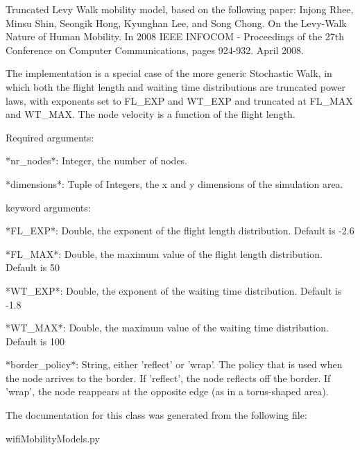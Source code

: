 \begin{DoxyVerb}Truncated Levy Walk mobility model, based on the following paper:
Injong Rhee, Minsu Shin, Seongik Hong, Kyunghan Lee, and Song Chong. On the Levy-Walk Nature of Human Mobility. 
    In 2008 IEEE INFOCOM - Proceedings of the 27th Conference on Computer Communications, pages 924-932. April 2008.

The implementation is a special case of the more generic Stochastic Walk, 
in which both the flight length and waiting time distributions are truncated power laws,
with exponents set to FL_EXP and WT_EXP and truncated at FL_MAX and WT_MAX.
The node velocity is a function of the flight length.

Required arguments:

  *nr_nodes*:
    Integer, the number of nodes.
  
  *dimensions*:
    Tuple of Integers, the x and y dimensions of the simulation area.
  
keyword arguments:

  *FL_EXP*:
    Double, the exponent of the flight length distribution. Default is -2.6
    
  *FL_MAX*:
    Double, the maximum value of the flight length distribution. Default is 50
  
  *WT_EXP*:
    Double, the exponent of the waiting time distribution. Default is -1.8
    
  *WT_MAX*:
    Double, the maximum value of the waiting time distribution. Default is 100
    
  *border_policy*:
    String, either 'reflect' or 'wrap'. The policy that is used when the node arrives to the border.
    If 'reflect', the node reflects off the border.
    If 'wrap', the node reappears at the opposite edge (as in a torus-shaped area).
\end{DoxyVerb}
 

The documentation for this class was generated from the following file\-:\begin{DoxyCompactItemize}
\item 
wifi\-Mobility\-Models.\-py\end{DoxyCompactItemize}
